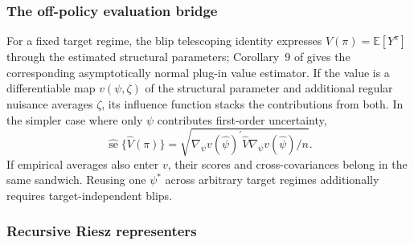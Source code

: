 \subsubsection*{The off-policy evaluation bridge}

For a fixed target regime, the blip telescoping identity expresses $V(\pi)=\mathbb E[Y^\pi]$ through the estimated structural parameters; Corollary~9 of \citet{lewisSyrgkanis2021dynamicDML} gives the corresponding asymptotically normal plug-in value estimator. If the value is a differentiable map $v(\psi,\zeta)$ of the structural parameter and additional regular nuisance averages $\zeta$, its influence function stacks the contributions from both. In the simpler case where only $\psi$ contributes first-order uncertainty,
\[
\widehat{\operatorname{se}}\{\hat V(\pi)\}
=\sqrt{
\nabla_\psi v(\hat\psi)^\prime
\hat V
\nabla_\psi v(\hat\psi)/n}.
\]
If empirical averages also enter $v$, their scores and cross-covariances belong in the same sandwich. Reusing one $\psi^*$ across arbitrary target regimes additionally requires target-independent blips.

\subsubsection*{Recursive Riesz representers}

